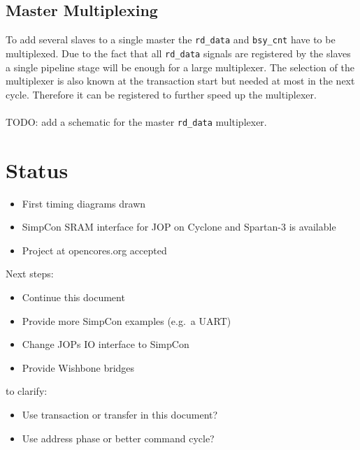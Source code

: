 \documentclass[a4paper,12pt]{scrartcl}
\newcommand{\sign}[1]{{\texttt{#1}}}
\begin{document}
\subsection{Master Multiplexing}

To add several slaves to a single master the \sign{rd\_data} and
\sign{bsy\_cnt} have to be multiplexed. Due to the fact that all
\sign{rd\_data} signals are registered by the slaves a single
pipeline stage will be enough for a large multiplexer. The selection
of the multiplexer is also known at the transaction start but needed
at most in the next cycle. Therefore it can be registered to further
speed up the multiplexer.
\\
\\
TODO: add a schematic for the master \sign{rd\_data} multiplexer.

\section{Status}

\begin{itemize}
    \item First timing diagrams drawn
    \item SimpCon SRAM interface for JOP on Cyclone and Spartan-3 is
    available
    \item Project at opencores.org accepted
\end{itemize}
%
Next steps:
%
\begin{itemize}
    \item Continue this document
    \item Provide more SimpCon examples (e.g.\ a UART)
    \item Change JOPs IO interface to SimpCon
    \item Provide Wishbone bridges
\end{itemize}
%
to clarify:
\begin{itemize}
    \item Use transaction or transfer in this document?
    \item Use address phase or better command cycle?
\end{itemize}
\end{document}
